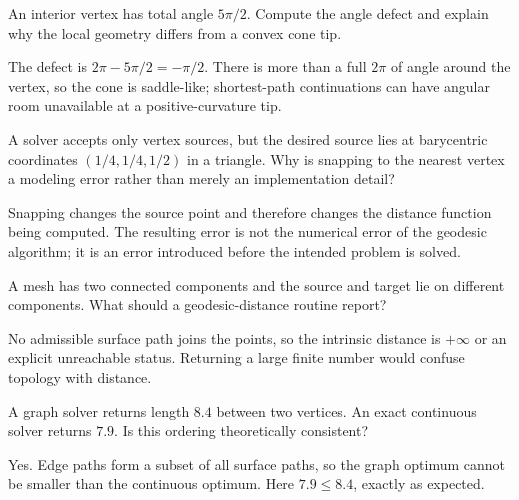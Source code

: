 \begin{problem}\label{prob:vii38-04}
An interior vertex has total angle \(5\pi/2\).  Compute the angle defect and explain why the local geometry differs from a convex cone tip.
\end{problem}

\begin{solution}
The defect is \(2\pi-5\pi/2=-\pi/2\).  There is more than a full \(2\pi\) of angle around the vertex, so the cone is saddle-like; shortest-path continuations can have angular room unavailable at a positive-curvature tip.
\end{solution}

\begin{problem}\label{prob:vii38-05}
A solver accepts only vertex sources, but the desired source lies at barycentric coordinates \((1/4,1/4,1/2)\) in a triangle.  Why is snapping to the nearest vertex a modeling error rather than merely an implementation detail?
\end{problem}

\begin{solution}
Snapping changes the source point and therefore changes the distance function being computed.  The resulting error is not the numerical error of the geodesic algorithm; it is an error introduced before the intended problem is solved.
\end{solution}

\begin{problem}\label{prob:vii38-06}
A mesh has two connected components and the source and target lie on different components.  What should a geodesic-distance routine report?
\end{problem}

\begin{solution}
No admissible surface path joins the points, so the intrinsic distance is \(+\infty\) or an explicit unreachable status.  Returning a large finite number would confuse topology with distance.
\end{solution}

\begin{problem}\label{prob:vii38-07}
A graph solver returns length \(8.4\) between two vertices.  An exact continuous solver returns \(7.9\).  Is this ordering theoretically consistent?
\end{problem}

\begin{solution}
Yes.  Edge paths form a subset of all surface paths, so the graph optimum cannot be smaller than the continuous optimum.  Here \(7.9\le8.4\), exactly as expected.
\end{solution}

